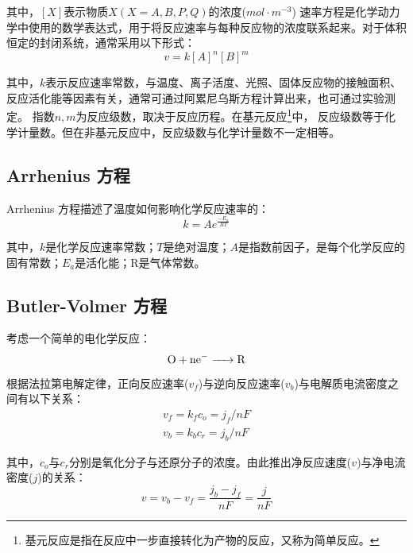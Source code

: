 其中，$[X]$表示物质$X (X=A,B,P,Q)$的浓度($mol\cdot{m^{-3}}$)
速率方程是化学动力学中使用的数学表达式，用于将反应速率与每种反应物的浓度联系起来。对于体积恒定的封闭系统，通常采用以下形式：
\begin{equation}
    v=k[A]^n[B]^m
\end{equation}

其中，$k$表示反应速率常数，与温度、离子活度、光照、固体反应物的接触面积、反应活化能等因素有关，通常可通过阿累尼乌斯方程计算出来，也可通过实验测定。
指数$n,m$为反应级数，取决于反应历程。在基元反应\footnote{基元反应是指在反应中一步直接转化为产物的反应，又称为简单反应。}中，
反应级数等于化学计量数。但在非基元反应中，反应级数与化学计量数不一定相等。\cite{Witelski2015}
\subsection{Arrhenius 方程}
Arrhenius 方程描述了温度如何影响化学反应速率的：
\begin{equation}
    k=Ae^{\frac{-E_a}{RT}}
\end{equation}

其中，$k$是化学反应速率常数；$T$是绝对温度；$A$是指数前因子，是每个化学反应的固有常数；$E_a$是活化能；R是气体常数。
\cite{ref1}
\subsection{Butler-Volmer 方程}
考虑一个简单的电化学反应：
\begin{equation}
    \ce{O + ne- -> R}
\end{equation}

根据法拉第电解定律，正向反应速率($v_f$)与逆向反应速率($v_b$)与电解质电流密度之间有以下关系：
\begin{equation}
    \begin{aligned}
        v_f=k_fc_o=j_f/nF\\
        v_b=k_bc_r=j_b/nF          %
    \end{aligned}
\end{equation}

其中，$c_o$与$c_r$分别是氧化分子与还原分子的浓度。由此推出净反应速度($v$)与净电流密度($j$)的关系：
\begin{equation}
    v=v_b-v_f=\frac{j_b-j_f}{nF}=\frac{j}{nF}
\end{equation}

